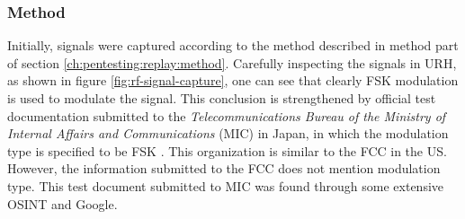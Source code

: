 \subsubsection{Method}
Initially, signals were captured according to the method described in method part of section \ref{ch:pentesting:replay:method}. Carefully inspecting the signals in \gls{URH}, as shown in figure \ref{fig:rf-signal-capture}, one can see that clearly \gls{FSK} modulation is used to modulate the signal. This conclusion is strengthened by official test documentation submitted to the \textit{Telecommunications Bureau of the Ministry of Internal Affairs and Communications} (MIC) in Japan, in which the modulation type is specified to be FSK \cite{mic-test-report}. This organization is similar to the FCC in the US. However, the information submitted to the FCC does not mention modulation type. This test document submitted to MIC was found through some extensive \gls{OSINT} and Google.

